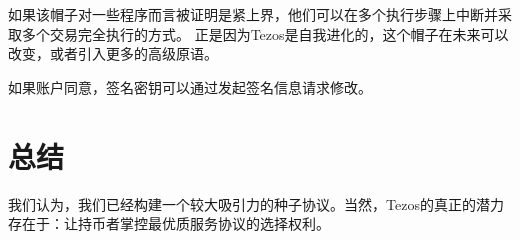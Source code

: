 \documentclass[letterpaper]{article}
\begin{document}
如果该帽子对一些程序而言被证明是紧上界，他们可以在多个执行步骤上中断并采取多个交易完全执行的方式。
正是因为Tezos是自我进化的，这个帽子在未来可以改变，或者引入更多的高级原语。

如果账户同意，签名密钥可以通过发起签名信息请求修改。

\section{总结}
我们认为，我们已经构建一个较大吸引力的种子协议。当然，Tezos的真正的潜力存在于：让持币者掌控最优质服务协议的选择权利。



\end{document}
